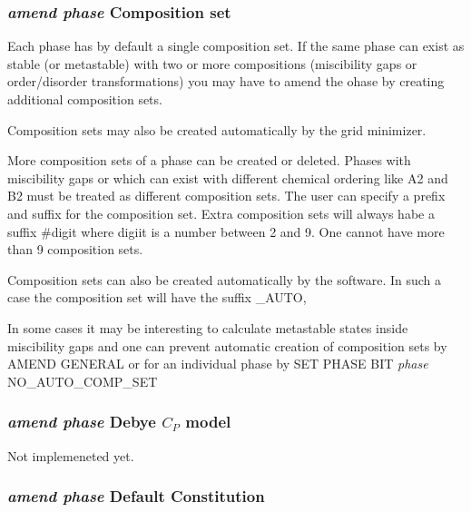 \documentclass[12pt]{article}
\begin{document}
\subsubsection{{\em amend phase} Composition set}

Each phase has by default a single composition set.  If the same phase
can exist as stable (or metastable) with two or more compositions
(miscibility gaps or order/disorder transformations) you may have to
amend the ohase by creating additional composition sets.  

Composition sets may also be created automatically by the grid
minimizer.

More composition sets of a phase can be created or deleted.  Phases
with miscibility gaps or which can exist with different chemical
ordering like A2 and B2 must be treated as different composition sets.
The user can specify a prefix and suffix for the composition set.
Extra composition sets will always habe a suffix \#digit where digiit
is a number between 2 and 9.  One cannot have more than 9 composition
sets.

Composition sets can also be created automatically by the software.  In
such a case the composition set will have the suffix \_AUTO,

In some cases it may be interesting to calculate metastable states inside
miscibility gaps and one can prevent automatic creation of composition
sets by {\rm AMEND GENERAL} or for an individual phase by {\rm SET
PHASE BIT {\em phase} NO\_AUTO\_COMP\_SET}

\subsubsection{{\em amend phase} Debye $C_P$ model}

Not implemeneted yet.

\subsubsection{{\em amend phase} Default Constitution}
\end{document}
